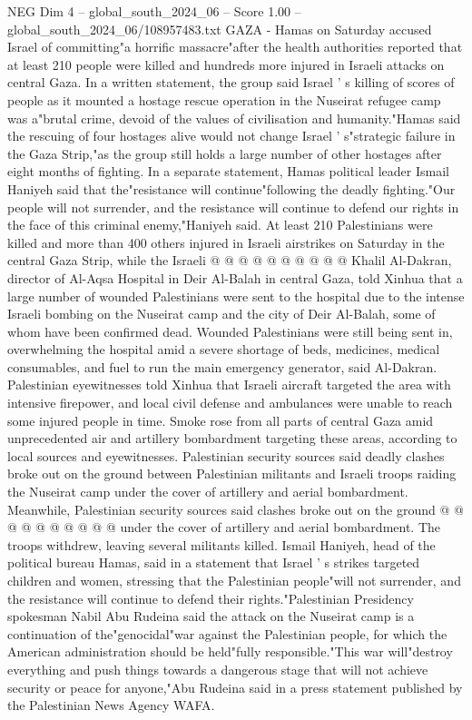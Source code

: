 \begin{textsample}{NEG Dim 4 – global\_south\_2024\_06 – Score 1.00 – global\_south\_2024\_06/108957483.txt}  \label{ex:f4_neg_379}
GAZA - Hamas on Saturday accused Israel of committing"a horrific massacre"after the health authorities reported that at least 210 people were killed and hundreds more injured in Israeli attacks on central Gaza.
In a written statement, the group said Israel ' s killing of scores of people as it mounted a hostage rescue operation in the Nuseirat refugee camp was a"brutal crime, devoid of the values of civilisation and humanity."Hamas said the rescuing of four hostages alive would not change Israel ' s"strategic failure in the Gaza Strip,"as the group still holds a large number of other hostages after eight months of fighting.
In a separate statement, Hamas political leader Ismail Haniyeh said that the"resistance will continue"following the deadly fighting."Our people will not surrender, and the resistance will continue to defend our rights in the face of this criminal enemy,"Haniyeh said.
At least 210 Palestinians were killed and more than 400 others injured in Israeli airstrikes on Saturday in the central Gaza Strip, while the Israeli @ @ @ @ @ @ @ @ @ @ Khalil Al-Dakran, director of Al-Aqsa Hospital in Deir Al-Balah in central Gaza, told Xinhua that a large number of wounded Palestinians were sent to the hospital due to the intense Israeli bombing on the Nuseirat camp and the city of Deir Al-Balah, some of whom have been confirmed dead.
Wounded Palestinians were still being sent in, overwhelming the hospital amid a severe shortage of beds, medicines, medical consumables, and fuel to run the main emergency generator, said Al-Dakran.
Palestinian eyewitnesses told Xinhua that Israeli aircraft targeted the area with intensive firepower, and local civil defense and ambulances were unable to reach some injured people in time.
Smoke rose from all parts of central Gaza amid unprecedented air and artillery bombardment targeting these areas, according to local sources and eyewitnesses.
Palestinian security sources said deadly clashes broke out on the ground between Palestinian militants and Israeli troops raiding the Nuseirat camp under the cover of artillery and aerial bombardment.
Meanwhile, Palestinian security sources said clashes broke out on the ground @ @ @ @ @ @ @ @ @ @ under the cover of artillery and aerial bombardment.
The troops withdrew, leaving several militants killed.
Ismail Haniyeh, head of the political bureau Hamas, said in a statement that Israel ' s strikes targeted children and women, stressing that the Palestinian people"will not surrender, and the resistance will continue to defend their rights."Palestinian Presidency spokesman Nabil Abu Rudeina said the attack on the Nuseirat camp is a continuation of the"genocidal"war against the Palestinian people, for which the American administration should be held"fully responsible."This war will"destroy everything and push things towards a dangerous stage that will not achieve security or peace for anyone,"Abu Rudeina said in a press statement published by the Palestinian News Agency WAFA.

\end{textsample}
